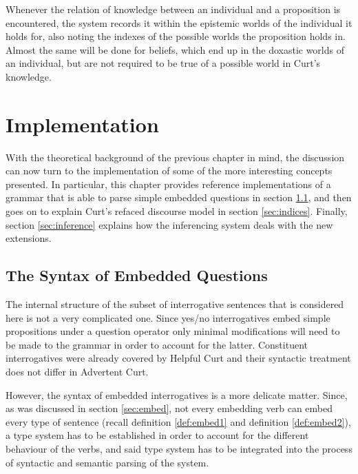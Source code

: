 \documentclass[notitlepage,twoside,a4paper]{scrreprt}
\newcommand{\pn}{\textsf} %
\newcommand{\curt}{\pn{Curt}}
\newcommand{\acurt}{\pn{Advertent Curt}}
\theoremstyle{remark}
\theoremstyle{remark}
\theoremstyle{definition}
\theoremstyle{definition}
\begin{document}
Whenever the relation of knowledge between an individual and a proposition is
encountered, the system records it within the epistemic worlds of the
individual it holds for, also noting the indexes of the possible worlds the
proposition holds in. Almost the same will be done for beliefs, which end up in
the doxastic worlds of an individual, but are not required to be true of a
possible world in \curt's knowledge.

\chapter{Implementation} \label{sec:implementation}


With the theoretical background of the previous chapter in mind, the discussion
can now turn to the implementation of some of the more interesting concepts
presented. In particular, this chapter provides reference implementations of a
grammar that is able to parse simple embedded questions in section
\ref{sec:Syntax}, and then goes on to explain \curt's refaced discourse model in
section \ref{sec:indices}. Finally, section \ref{sec:inference} explains how the
inferencing system deals with the new extensions.

\section{The Syntax of Embedded Questions}\label{sec:Syntax}

The internal structure of the subset of interrogative sentences that is
considered here is not a very complicated one. Since yes/no interrogatives  embed
simple propositions under a question operator only minimal modifications will
need to be made to the grammar in order to account for the latter. Constituent
interrogatives were already covered by \pn{Helpful Curt} and their syntactic
treatment does not differ in \acurt{}.

However, the syntax of embedded interrogatives is a more delicate matter. Since,
as was discussed in section \ref{sec:embed}, not every embedding verb can embed
every type of sentence (recall definition \ref{def:embed1} and definition
\ref{def:embed2}), a type system has to be established in order to account for
the different behaviour of the verbs, and said type system has to be integrated
into the process of syntactic and semantic parsing of the system.
\end{document}
